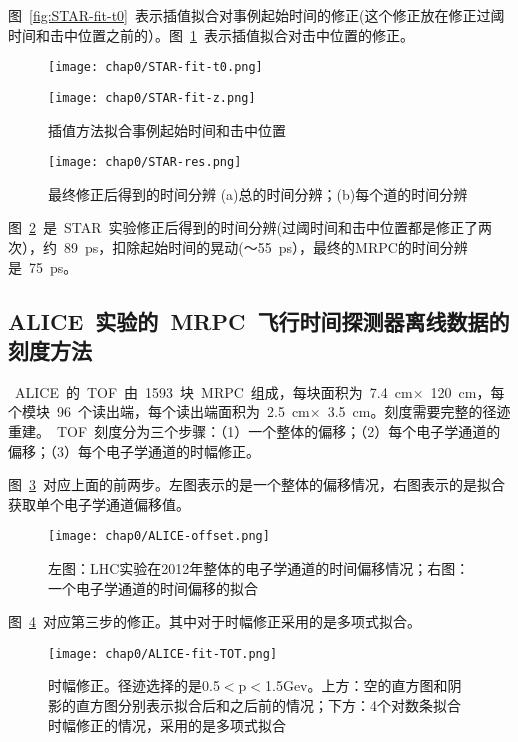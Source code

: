 图~\ref{fig:STAR-fit-t0}~表示插值拟合对事例起始时间的修正(这个修正放在修正过阈时间和击中位置之前的）。图~\ref{fig:STAR-fit-z}~表示插值拟合对击中位置的修正。
\begin{figure}[!h]
\begin{minipage}[!h]{0.48\linewidth}
\centering
\texttt{[image: chap0/STAR-fit-t0.png]}
\label{fig:STAR-fit-t0}
\end{minipage}
\begin{minipage}[!h]{0.48\linewidth}
\centering
\texttt{[image: chap0/STAR-fit-z.png]}
\label{fig:STAR-fit-z}
\end{minipage}%
\caption{插值方法拟合事例起始时间和击中位置}
\end{figure}


\begin{figure}[!h]
  \centering
  \texttt{[image: chap0/STAR-res.png]}
  \caption{最终修正后得到的时间分辨 (a)总的时间分辨；(b)每个道的时间分辨}
  \label{fig:STAR-res}
\end{figure}

图~\ref{fig:STAR-res}~是~STAR~实验修正后得到的时间分辨(过阈时间和击中位置都是修正了两次），约~89~ps，扣除起始时间的晃动(～55~ps），最终的MRPC的时间分辨是~75~ps。


\subsection{ALICE~实验的~MRPC~飞行时间探测器离线数据的刻度方法}
~ALICE~的~TOF~由~1593~块~MRPC~组成，每块面积为~7.4~cm$\times$~120~cm，每个模块~96~个读出端，每个读出端面积为~2.5~cm$\times$~3.5~cm。刻度需要完整的径迹重建。~TOF~刻度分为三个步骤：（1）一个整体的偏移；（2）每个电子学通道的偏移；（3）每个电子学通道的时幅修正。

图~\ref{fig:ALICE-offset}~对应上面的前两步。左图表示的是一个整体的偏移情况，右图表示的是拟合获取单个电子学通道偏移值。
\begin{figure}[!h]
  \centering
  \texttt{[image: chap0/ALICE-offset.png]}
  \caption{左图：LHC实验在2012年整体的电子学通道的时间偏移情况；右图：一个电子学通道的时间偏移的拟合}
  \label{fig:ALICE-offset}
\end{figure}

图~\ref{fig:ALICE-fit-TOT}~对应第三步的修正。其中对于时幅修正采用的是多项式拟合。
\begin{figure}[!h]
  \centering
  \texttt{[image: chap0/ALICE-fit-TOT.png]}
  \caption{时幅修正。径迹选择的是0.5$<$p$<$1.5Gev。上方：空的直方图和阴影的直方图分别表示拟合后和之后前的情况；下方：4个对数条拟合时幅修正的情况，采用的是多项式拟合}
  \label{fig:ALICE-fit-TOT}
\end{figure}

